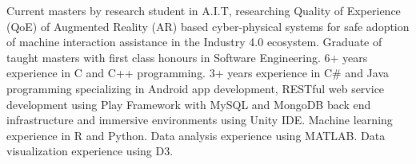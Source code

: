 

\begin{cvparagraph}

Current masters by research student in A.I.T, researching Quality of Experience (QoE) of Augmented Reality (AR) based cyber-physical systems for safe adoption of machine interaction assistance in the Industry 4.0 ecosystem. Graduate of taught masters with first class honours in Software Engineering. 6+ years experience in C and C++ programming. 3+ years experience in C# and Java programming specializing in Android app development, RESTful web service development using Play Framework with MySQL and MongoDB back end infrastructure and immersive environments using Unity IDE. Machine learning experience in R and Python. Data analysis experience using MATLAB. Data visualization experience using D3.
\end{cvparagraph}
